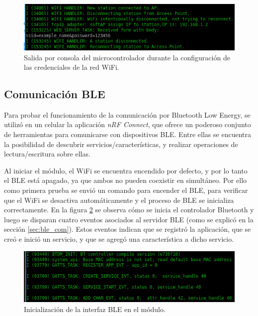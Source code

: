 \begin{figure}[h]
\centering
\includegraphics[width=\textwidth]{./Figures/output_web_server.png}
\caption{Salida por consola del microcontrolador durante la configuración de las credenciales de la red WiFi.}
\label{fig:output_web_server}
\end{figure}

\subsection{Comunicación BLE}

Para probar el funcionamiento de la comunicación por Bluetooth Low Energy, se utilizó en un celular la aplicación \emph{nRF Connect}, que ofrece un poderoso conjunto de herramientas para comunicarse con dispositivos BLE. Entre ellas se encuentra la posibilidad de descubrir servicios/características, y realizar operaciones de lectura/escritura sobre ellas.

Al iniciar el módulo, el WiFi se encuentra encendido por defecto, y por lo tanto el BLE está apagado, ya que ambos no pueden coexistir en simultáneo. Por ello como primera prueba se envió un comando para encender el BLE, para verificar que el WiFi se desactiva automáticamente y el proceso de BLE se inicializa correctamente. En la figura \ref{fig:ble_init} se observa cómo se inicia el controlador Bluetooth y luego se disparan cuatro eventos asociados al servidor BLE (como se explicó en la sección \ref{sec:ble_com}). Estos eventos indican que se registró la aplicación, que se creó e inició un servicio, y que se agregó una característica a dicho servicio.

\begin{figure}[h]
\centering
\includegraphics[width=\textwidth]{./Figures/ble_init.png}
\caption{Inicialización de la interfaz BLE en el módulo.}
\label{fig:ble_init}
\end{figure}

